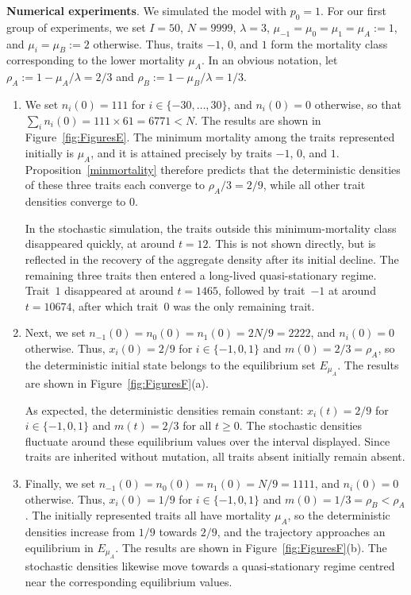 \documentclass[12pt]{article}
\begin{document}
\medskip
\noindent
{\bf Numerical experiments}.
We simulated the model with $p_0=1$. For our first group of experiments,
we set $I=50$, $N=9999$, $\lambda=3$,
$\mu_{-1}=\mu_0=\mu_1=\mu_A:=1$, and $\mu_i=\mu_B:=2$ otherwise.
Thus, traits $-1$, $0$, and $1$ form the mortality class corresponding
to the lower mortality $\mu_A$. In an obvious notation, let
$\rho_A:=1-\mu_A/\lambda=2/3$ and
$\rho_B:=1-\mu_B/\lambda=1/3$.

\begin{enumerate}
\item[(i)]
We set $n_i(0)=111$ for $i\in\{-30,\ldots,30\}$, and $n_i(0)=0$
otherwise, so that $\sum_i n_i(0)=111\times61=6771<N$.
The results are shown in Figure~\ref{fig:FiguresE}. The minimum
mortality among the traits represented initially is $\mu_A$, and it is
attained precisely by traits $-1$, $0$, and $1$.
Proposition~\ref{minmortality} therefore predicts that the deterministic
densities of these three traits each converge to
$\rho_A/3=2/9$, while all other trait densities converge to $0$.

In the stochastic simulation, the traits outside this
minimum-mortality class disappeared quickly, at around $t=12$. This is
not shown directly, but is reflected in the recovery of the aggregate
density after its initial decline. The remaining three traits then
entered a long-lived quasi-stationary regime. Trait~$1$ disappeared at
around $t=1465$, followed by trait~$-1$ at around $t=10674$, after which
trait~$0$ was the only remaining trait.

\item[(ii)]
Next, we set
$n_{-1}(0)=n_0(0)=n_1(0)=2N/9=2222$, and $n_i(0)=0$ otherwise.
Thus, $x_i(0)=2/9$ for $i\in\{-1,0,1\}$ and
$m(0)=2/3=\rho_A$, so the deterministic initial state belongs to the
equilibrium set $E_{\mu_A}$. The results are shown in
Figure~\ref{fig:FiguresF}(a).

As expected, the deterministic densities remain constant:
$x_i(t)=2/9$ for $i\in\{-1,0,1\}$ and $m(t)=2/3$ for all $t\geq0$.
The stochastic densities fluctuate around these equilibrium values over
the interval displayed. Since traits are inherited without mutation,
all traits absent initially remain absent.

\item[(iii)]
Finally, we set
$n_{-1}(0)=n_0(0)=n_1(0)=N/9=1111$, and $n_i(0)=0$ otherwise.
Thus, $x_i(0)=1/9$ for $i\in\{-1,0,1\}$ and
$m(0)=1/3=\rho_B<\rho_A$. The initially represented traits all have
mortality $\mu_A$, so the deterministic densities increase from $1/9$
towards $2/9$, and the trajectory approaches an equilibrium in
$E_{\mu_A}$. The results are shown in Figure~\ref{fig:FiguresF}(b).
The stochastic densities likewise move towards a quasi-stationary regime
centred near the corresponding equilibrium values.
\end{enumerate}
\end{document}
